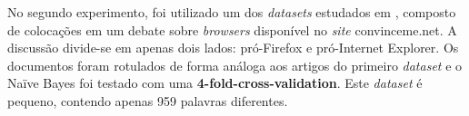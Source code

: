 No segundo experimento, foi utilizado um dos \emph{datasets} estudados em \cite{somasundaran}, composto de colocações em um debate sobre \emph{browsers} disponível no \emph{site} convinceme.net. A discussão divide-se em apenas dois lados: pró-Firefox e pró-Internet Explorer. Os documentos foram rotulados de forma análoga aos artigos do primeiro \emph{dataset} e o Naïve Bayes foi testado com uma \textbf{4-fold-cross-validation}. Este \emph{dataset} é pequeno, contendo apenas 959 palavras diferentes. %








